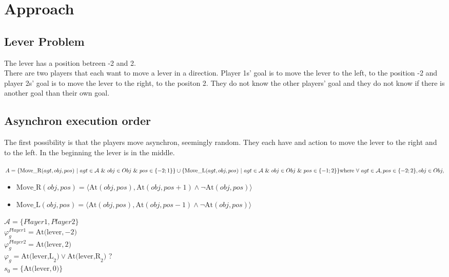 \chapter{Approach}\label{chap:approach}

\section{Lever Problem}
  The lever has a position betreen -2 and 2.\\
  There are two players that each want to move a lever in a direction. Player 1s' goal is to move the lever to the left, to the position -2 and player 2s' goal is to move the lever to the right, to the positon 2. They do not know the other players' goal and they do not know if there is another goal than their own goal.

\section{Asynchron execution order}
  The first possibility is that the players move asynchron, seemingly random. They each have and action to move the lever to the right and to the left. In the beginning the lever is in the middle.

  $
  A=
  \{\text{Move\_R}(agt,obj,pos) \ | \ agt \in \mathcal{A} \ \& \ obj \in Obj \ \& \ pos \in \{ -2;1\}\} \cup \\
  \{\text{Move\_L}(agt,obj,pos) \ | \ agt \in \mathcal{A} \ \& \ obj \in Obj \ \& \ pos \in \{ -1;2\}\} \\
  \text{where} \ \forall \ agt \in \mathcal{A}, pos \in \{ -2;2\}, obj \in Obj ,
  $
  \begin{itemize}
    \item $
      \text{Move\_R}(obj,pos) = \langle \text{At}(obj, pos) , \text{At}(obj, pos+1) \wedge \neg \text{At}(obj,pos) \rangle
      $
    \item $
      \text{Move\_L}(obj,pos) = \langle \text{At}(obj, pos) , \text{At}(obj, pos-1) \wedge \neg \text{At}(obj,pos) \rangle
      $
  \end{itemize}
  $\mathcal{A}= \{Player1, Player2\}$ \\
  $\varphi^{Player1}_g = \text{At(lever},-2)$  \\
  $\varphi^{Player2}_g = \text{At(lever},2)$ \\
  $\varphi_g = \text{At(lever,L}_2) \vee \text{At(lever,R}_2)$ ? \\
  $s_0 = \{\text{At(lever}, 0) \}$

